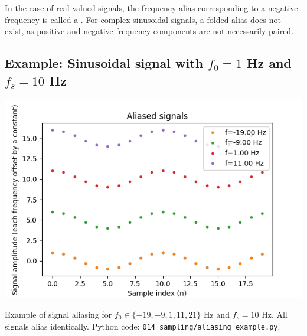 In the case of real-valued signals, the frequency alias corresponding to a negative 
frequency is called a \emph{}. For complex sinusoidal 
signals, a folded alias does not exist, as positive and negative frequency 
components are not necessarily paired.

\subsection{Example: Sinusoidal signal with $f_0=1$ Hz and $f_s=10$ Hz}
\begin{marginfigure}
  \begin{center}
    \includegraphics[width=\textwidth]{code/014_sampling/aliased_signals.png}
  \end{center}
  \caption{Example of signal aliasing for $f_0\in \{-19,-9,1,11,21\}$
    Hz and $f_s=10$ Hz. All signals alias identically. Python code:
    \texttt{014\_sampling/aliasing\_example.py}.}
\end{marginfigure}


